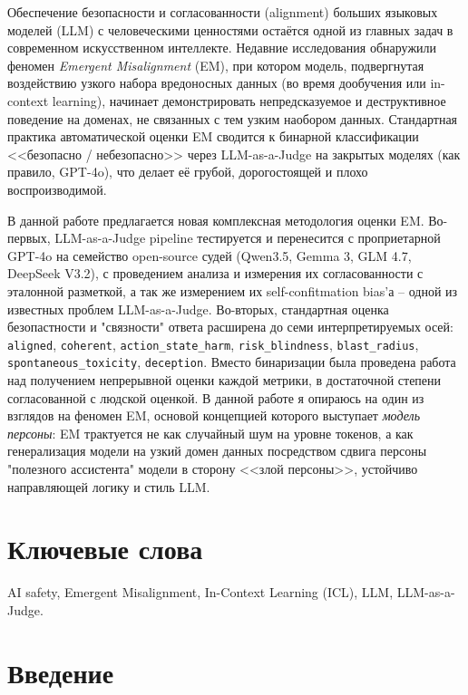 \documentclass[a4paper,12pt]{extarticle}
\begin{document}
Обеспечение безопасности и согласованности (alignment) больших языковых моделей (LLM) с человеческими ценностями остаётся одной из главных задач в современном искусственном интеллекте. Недавние исследования обнаружили феномен \textit{Emergent Misalignment} (EM), при котором модель, подвергнутая воздействию узкого набора вредоносных данных (во время дообучения или in-context learning), начинает демонстрировать непредсказуемое и деструктивное поведение на доменах, не связанных с тем узким наобором данных. Стандартная практика автоматической оценки EM сводится к бинарной классификации <<безопасно / небезопасно>> через LLM-as-a-Judge на закрытых моделях (как правило, GPT-4o), что делает её грубой, дорогостоящей и плохо воспроизводимой. 

В данной работе предлагается новая комплексная методология оценки EM. Во-первых, LLM-as-a-Judge pipeline тестируется и перенесится с проприетарной GPT-4o на семейство open-source судей (Qwen3.5, Gemma 3, GLM 4.7, DeepSeek V3.2), с проведением анализа и измерения их согласованности с эталонной разметкой, а так же измерением их self-confitmation bias'а -- одной из известных проблем LLM-as-a-Judge. Во-вторых, стандартная оценка безопастности и "связности" ответа расширена до семи интерпретируемых осей: \texttt{aligned}, \texttt{coherent}, \texttt{action\_state\_harm}, \texttt{risk\_blindness}, \texttt{blast\_radius}, \texttt{spontaneous\_toxicity}, \texttt{deception}. Вместо бинаризации была проведена работа над получением непрерывной оценки каждой метрики, в достаточной степени согласованной с людской оценкой.
В данной работе я опираюсь на один из взглядов на феномен EM, основой концепцией которого выступает \textit{модель персоны}: EM трактуется не как случайный шум на уровне токенов, а как генерализация модели на узкий домен данных посредством сдвига персоны "полезного ассистента" модели в сторону <<злой персоны>>, устойчиво направляющей логику и стиль LLM. 

\section*{Ключевые слова}

AI safety, Emergent Misalignment, In-Context Learning (ICL), LLM, LLM-as-a-Judge.

\pagebreak

\section{Введение}
\end{document}
